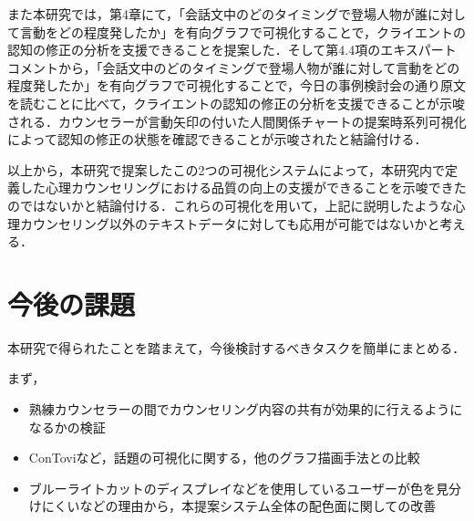 \documentclass[shuuron]{kuee}
\begin{document}
また本研究では，第4章にて，「会話文中のどのタイミングで登場人物が誰に対して言動をどの程度発したか」を有向グラフで可視化することで，クライエントの認知の修正の分析を支援できることを提案した．そして第4.4項のエキスパートコメントから，「会話文中のどのタイミングで登場人物が誰に対して言動をどの程度発したか」を有向グラフで可視化することで，今日の事例検討会の通り原文を読むことに比べて，クライエントの認知の修正の分析を支援できることが示唆される．カウンセラーが言動矢印の付いた人間関係チャートの提案時系列可視化によって認知の修正の状態を確認できることが示唆されたと結論付ける．

以上から，本研究で提案したこの2つの可視化システムによって，本研究内で定義した心理カウンセリングにおける品質の向上の支援ができることを示唆できたのではないかと結論付ける．これらの可視化を用いて，上記に説明したような心理カウンセリング以外のテキストデータに対しても応用が可能ではないかと考える．


\section{今後の課題}

本研究で得られたことを踏まえて，今後検討するべきタスクを簡単にまとめる．

まず，

\begin{itemize}
  \item 熟練カウンセラーの間でカウンセリング内容の共有が効果的に行えるようになるかの検証
  \item ConTovi\cite{el2016contovi}など，話題の可視化に関する，他のグラフ描画手法との比較
  \item ブルーライトカットのディスプレイなどを使用しているユーザーが色を見分けにくいなどの理由から，本提案システム全体の配色面に関しての改善
\end{itemize}
\end{document}

